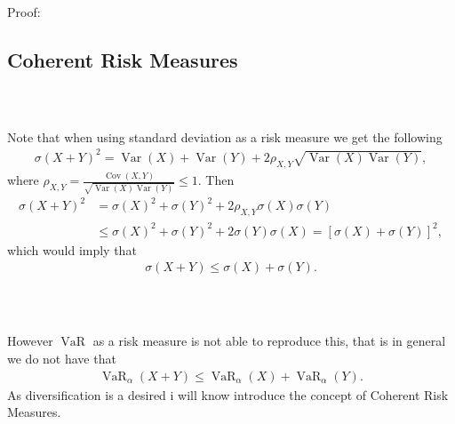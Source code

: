 \documentclass{beamer}
\numberwithin{equation}{section}
\DeclareMathOperator*{\var}{Var}
\DeclareMathOperator*{\cov}{Cov}
\DeclareMathOperator{\VaR}{VaR}
\begin{document}
\begin{frame}\frametitle{{\normalsize \secname} \\ {\large \subsecname}}
    Proof:
    \vspace{6cm}
\end{frame}

\subsection{Coherent Risk Measures}

\begin{frame}\frametitle{{\normalsize \secname} \\ {\large \subsecname}}
    Note that when using standard deviation as a risk measure we get the following
    \begin{align}
        \sigma(X + Y)^2 = \var(X) + \var(Y) + 2\rho_{X,Y}\sqrt{\var(X)\var(Y)},
    \end{align}
    where $\rho_{X,Y} = \frac{\cov(X,Y)}{\sqrt{\var(X)\var(Y)}} \leq 1$.
    Then
    \begin{align}
        \sigma(X + Y)^2 &= \sigma(X)^2 + \sigma(Y)^2 + 2\rho_{X,Y}\sigma(X)\sigma(Y)\\
        &\leq \sigma(X)^2 + \sigma(Y)^2 + 2\sigma(Y)\sigma(X) = \left[\sigma(X) + \sigma(Y)\right]^2,
    \end{align}
    which would imply that
    \begin{align}
        \sigma(X + Y) \leq \sigma(X) + \sigma(Y).
    \end{align}
\end{frame}

\begin{frame}\frametitle{{\normalsize \secname} \\ {\large \subsecname}}
    However $\VaR$ as a risk measure is not able to reproduce this, that is in general we do not have that
    \begin{align}
        \VaR_\alpha(X + Y) \leq \VaR_\alpha(X) + \VaR_\alpha(Y).
    \end{align}
    As diversification is a desired i will know introduce the concept of Coherent Risk Measures.
\end{frame}
\end{document}

